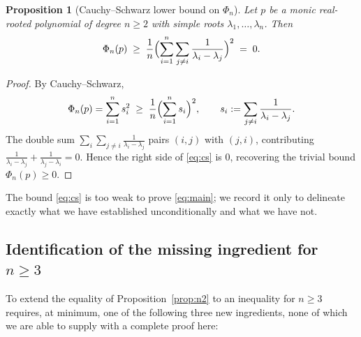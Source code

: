 \documentclass[12pt]{article}
\newtheorem{proposition}[theorem]{Proposition}
\theoremstyle{definition}
\begin{document}
\begin{proposition}[Cauchy--Schwarz lower bound on $\Phi_n$]\label{prop:cs}
Let $p$ be a monic real-rooted polynomial of degree $n\geq 2$ with simple roots $\lambda_1,\dots,\lambda_n$. Then
\begin{equation}\label{eq:cs}
\Phi_n(p) \;\geq\; \frac{1}{n}\Bigl(\sum_{i=1}^n\sum_{j\neq i}\frac{1}{\lambda_i-\lambda_j}\Bigr)^2 \;=\; 0.
\end{equation}
\end{proposition}
\begin{proof}
By Cauchy--Schwarz,
\[
\Phi_n(p) = \sum_{i=1}^n s_i^2 \;\geq\; \frac{1}{n}\Bigl(\sum_{i=1}^n s_i\Bigr)^2,\qquad s_i:=\sum_{j\neq i}\frac{1}{\lambda_i-\lambda_j}.
\]
The double sum $\sum_i\sum_{j\neq i}\frac{1}{\lambda_i-\lambda_j}$ pairs $(i,j)$ with $(j,i)$, contributing $\frac{1}{\lambda_i-\lambda_j}+\frac{1}{\lambda_j-\lambda_i}=0$. Hence the right side of \eqref{eq:cs} is $0$, recovering the trivial bound $\Phi_n(p)\geq 0$.
\end{proof}

The bound \eqref{eq:cs} is too weak to prove \eqref{eq:main}; we record it only to delineate exactly what we have established unconditionally and what we have not.

\subsection{Identification of the missing ingredient for $n\geq 3$}

To extend the equality of Proposition~\ref{prop:n2} to an inequality for $n\geq 3$ requires, at minimum, one of the following three new ingredients, none of which we are able to supply with a complete proof here:
\end{document}
